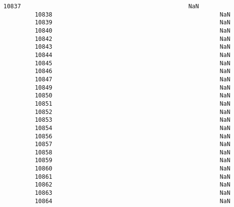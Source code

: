 \documentclass[11pt]{article}
\begin{document}
\begin{Verbatim}[commandchars=\\\{\}]
         10837                                                NaN   
         10838                                                NaN   
         10839                                                NaN   
         10840                                                NaN   
         10842                                                NaN   
         10843                                                NaN   
         10844                                                NaN   
         10845                                                NaN   
         10846                                                NaN   
         10847                                                NaN   
         10849                                                NaN   
         10850                                                NaN   
         10851                                                NaN   
         10852                                                NaN   
         10853                                                NaN   
         10854                                                NaN   
         10856                                                NaN   
         10857                                                NaN   
         10858                                                NaN   
         10859                                                NaN   
         10860                                                NaN   
         10861                                                NaN   
         10862                                                NaN   
         10863                                                NaN   
         10864                                                NaN   
         

\end{Verbatim}
\end{document}

